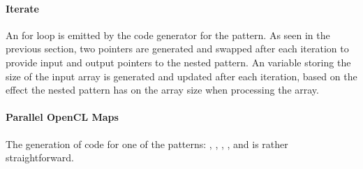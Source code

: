 \paragraph{Iterate}
An for loop is emitted by the code generator for the \iterateN pattern.
As seen in the previous section, two pointers are generated and swapped after each iteration to provide input and output pointers to the nested pattern.
An variable storing the size of the input array is generated and updated after each iteration, based on the effect the nested pattern has on the array size when processing the array.


\paragraph{Parallel OpenCL Maps}
The generation of \OpenCL code for one of the \map patterns: \mapWorkgroup, \mapLocal, \mapGlobal, \mapWarp, and \mapLane is rather straightforward.

